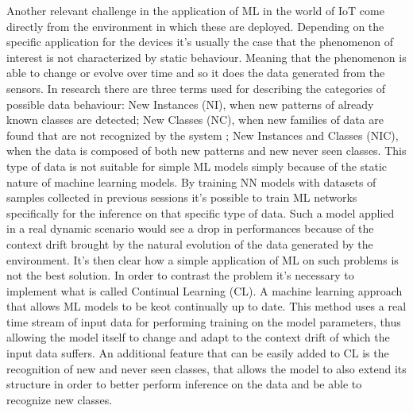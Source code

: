 \documentclass[12pt]{report}
\begin{document}
Another relevant challenge in the application of ML in the world of IoT come directly from the environment in which these are deployed. Depending on the specific application for the devices it's usually the case that the phenomenon of interest is not characterized by static behaviour. Meaning that the phenomenon is able to change or evolve over time and so it does the data generated from the sensors. In research there are three terms used for describing the categories of possible data behaviour: New Instances (NI), when new patterns of already known classes are detected; New Classes (NC), when new families of data are found that are not recognized by the system ; New Instances and Classes (NIC), when the data is composed of both new patterns and new never seen classes. This type of data is not suitable for simple ML models simply because of the static nature of machine learning models. By training NN models with datasets of samples collected in previous sessions it's possible to train ML networks specifically for the inference on that specific type of data. Such a model applied in a real dynamic scenario would see a drop in performances because of the context drift brought by the natural evolution of the data generated by the environment. It's then clear how a simple application of ML on such problems is not the best solution. In order to contrast the problem it's necessary to implement what is called Continual Learning (CL). A machine learning approach that allows ML models to be keot continually up to date. This method uses a real time stream of input data for performing training on the model parameters, thus allowing the model itself to change and adapt to the context drift of which the input data suffers. An additional feature that can be easily added to CL is the recognition of new and never seen classes, that allows the model to also extend its structure in order to better perform inference on the data and be able to recognize new classes. \\
\end{document}
